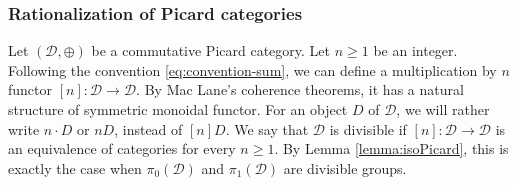 \documentclass[11pt]{article}
\theoremstyle{plain}
\theoremstyle{definition}
\newcommand{\Dcal}{\mathcal D}
\begin{document}
\subsubsection{Rationalization of Picard categories}\label{subsubsec:rationalization-picard-categories}
Let $(\Dcal,\oplus)$ be a commutative Picard category. Let $n\geq 1$ be an integer. Following the convention \eqref{eq:convention-sum}, we can define a multiplication by $n$ functor $[n]\colon\Dcal\to\Dcal$. By Mac Lane's coherence theorems, it has a natural structure of symmetric monoidal functor. For an object $D$ of $\Dcal$, we will rather write $n\cdot D$ or $nD$, instead of $[n]D$. We say that $\Dcal$ is divisible if $[n]: \Dcal \to \Dcal$ is an equivalence of categories for every $n\geq 1$. By Lemma \ref{lemma:isoPicard}, this is exactly the case when $\pi_0(\Dcal)$ and $\pi_1(\Dcal)$ are divisible groups.
\end{document}
